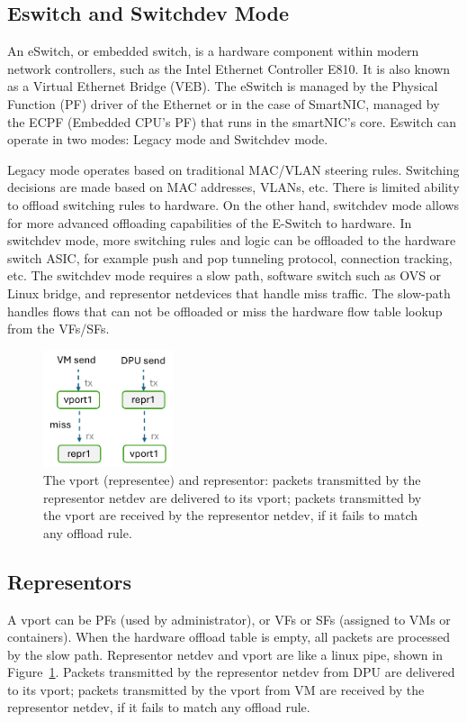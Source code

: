 \documentclass[letterpaper]{article}
\begin{document}
\subsection{Eswitch and Switchdev Mode}
An eSwitch, or embedded switch, is a hardware component within modern network
controllers, such as the Intel Ethernet Controller E810. It is also known as
a Virtual Ethernet Bridge (VEB). The eSwitch is managed by the Physical Function (PF)
driver of the Ethernet or in the case of SmartNIC, managed by the ECPF (Embedded
CPU's PF) that runs in the smartNIC's core. Eswitch can operate in two modes:
Legacy mode and Switchdev mode.

Legacy mode operates based on traditional MAC/VLAN steering rules. Switching
decisions are made based on MAC addresses, VLANs, etc. There is limited ability
to offload switching rules to hardware.
On the other hand, switchdev mode allows for more advanced offloading
capabilities of the E-Switch to hardware. In switchdev mode, more switching
rules and logic can be offloaded to the hardware switch ASIC, for example
push and pop tunneling protocol, connection tracking, etc.
The switchdev mode requires a slow path, software switch such as OVS or
Linux bridge, and representor netdevices that handle miss traffic.
The slow-path handles flows that can not be offloaded or miss the hardware
flow table lookup from the VFs/SFs.
\begin{figure}[h]
\includegraphics[width=1.5in]{pipe.pdf}
\centering
\caption{The vport (representee) and representor: packets transmitted by the representor 
netdev are delivered to its vport; packets transmitted by the vport are
received by the representor netdev, if it fails to match any offload rule.}
\label{fig:pipe}
\end{figure}

\subsection{Representors}
A vport can be PFs (used by administrator), or VFs or SFs (assigned to VMs
or containers). When the hardware offload table is empty, all packets are 
processed by the slow path. Representor netdev and vport are like a linux
pipe, shown in Figure~\ref{fig:pipe}. Packets transmitted by the representor
netdev from DPU are delivered to its vport; packets transmitted by the vport
from VM are received by the representor netdev, if it fails to match any
offload rule.
\end{document}
